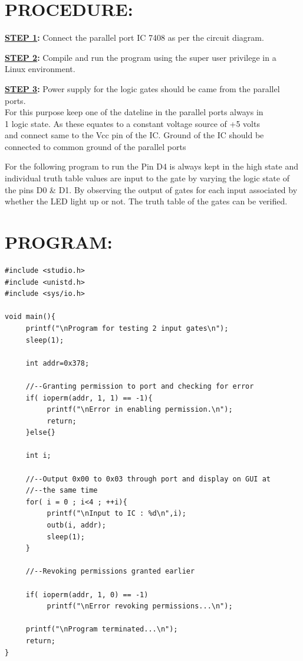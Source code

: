 \documentclass[a4paper,28pt]{report}
\begin{document}
\section*{PROCEDURE:}

\textbf{\underline{STEP 1}:} Connect the parallel port IC 7408 as per the circuit diagram.

\textbf{\underline{STEP 2}:}  Compile and run the program using the super user privilege in a\\\hspace*{50pt} Linux environment.

\textbf{\underline{STEP 3}:}  Power supply for the logic gates should be came from the parallel ports.\\\hspace*{50pt}For this purpose keep one of the dateline in the parallel ports always in\\\hspace*{50pt}1 logic state.
As these equates to a constant voltage source of +5 volts\\\hspace*{50pt}and connect same to the Vcc pin of the IC. Ground of the IC should be\\\hspace*{50pt}connected to common ground of the parallel ports


For the following program to run the Pin D4 is always kept in the high state and individual truth table values are input to the gate by varying the logic state of the pins D0 \& D1. By observing the output of gates for each input associated by whether the LED light up or not. The truth table of the gates can be verified.


\section*{PROGRAM:}

\begin{lstlisting}
#include <studio.h>
#include <unistd.h>
#include <sys/io.h>

void main(){
     printf("\nProgram for testing 2 input gates\n");
     sleep(1);

     int addr=0x378;
     
     //--Granting permission to port and checking for error
     if( ioperm(addr, 1, 1) == -1){
          printf("\nError in enabling permission.\n");
          return;
     }else{}
     
     int i;
     
     //--Output 0x00 to 0x03 through port and display on GUI at
     //--the same time
     for( i = 0 ; i<4 ; ++i){
          printf("\nInput to IC : %d\n",i);
          outb(i, addr);
          sleep(1);
     }
     
     //--Revoking permissions granted earlier
     
     if( ioperm(addr, 1, 0) == -1)
          printf("\nError revoking permissions...\n");
     
     printf("\nProgram terminated...\n");
     return;
}

\end{lstlisting}
\end{document}
